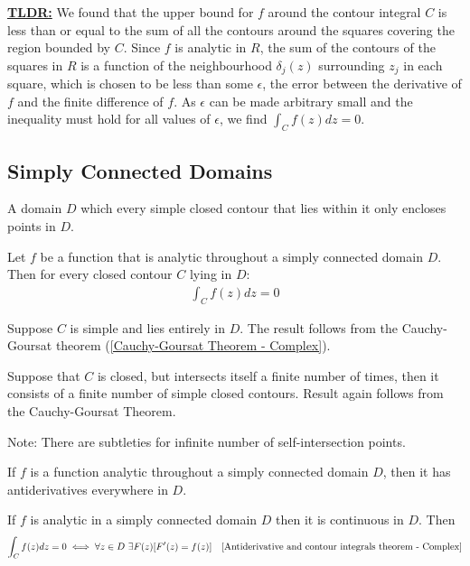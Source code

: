 \documentclass[12pt, english]{book}
\makeatletter
\renewenvironment{proof}[1][\proofname]{\par
	\pushQED{\qed}%
	\normalfont \topsep6\p@\@plus6\p@\relax
	\list{}{%
		\settowidth{\leftmargin}{\itshape\proofname:\hskip\labelsep}%
		\setlength{\labelwidth}{0pt}%
		\setlength{\itemindent}{-\leftmargin}%
	}%
	\item[\hskip\labelsep\itshape#1\@addpunct{:}]\ignorespaces
}{%
	\popQED\endlist\@endpefalse
}
\makeatother
\begin{document}
\begin{proof}
		\underline{\textbf{TLDR:}} \newline 
		We found that the upper bound for \(f\) around the contour integral \(C\) is less than or equal to the sum of all the contours around the squares covering the region bounded by \(C\). Since \(f\) is analytic in \(R\), the sum of the contours of the squares in \(R\) is a function of the neighbourhood \(\delta_j (z)\) surrounding \(z_j\) in each square, which is chosen to be less than some \(\epsilon\), the error between the derivative of \(f\) and the finite difference of \(f\). 
		As \(\epsilon\) can be made arbitrary small and the inequality must hold for all values of \(\epsilon\), we find \(\int_{C} f(z) dz = 0\).
	\end{proof}

	\subsection{Simply Connected Domains} \label{Simply Connected Domains Subsection - Complex}
	
	\begin{definition}
		\label{Simply Connected (Domain) Definition - Complex}
		A domain \(D\) which every simple closed contour that lies within it only encloses points in \(D\).
	\end{definition}

	\begin{theorem}
		\label{Contour integral in simply connected domain Theorem - Complex}
		Let \(f\) be a function that is analytic throughout a simply connected domain \(D\). Then for every closed contour \(C\) lying in \(D\):
		\begin{align*}
			\int_{C} f(z) dz = 0
		\end{align*}
	\end{theorem}
	\begin{proof}
		Suppose \(C\) is simple and lies entirely in \(D\). The result follows from the Cauchy-Goursat theorem (\cref{Cauchy-Goursat Theorem - Complex}).
		
		Suppose that \(C\) is closed, but intersects itself a finite number of times, then it consists of a finite number of simple closed contours. Result again follows from the Cauchy-Goursat Theorem. 
		
		Note: There are subtleties for infinite number of self-intersection points. 
	\end{proof}

	\begin{corollary}
		If \(f\) is a function analytic throughout a simply connected domain \(D\), then it has antiderivatives everywhere in \(D\).
	\end{corollary}
	\begin{proof}
		If \(f\) is analytic in a simply connected domain \(D\) then it is continuous in \(D\). Then
		\begin{align*}
			\int_{C} f(z) dz = 0 &\iff \forall z \in D \ \exists F(z)[F'(z) = f(z)] 
				&\Cref{Antiderivative and contour integrals theorem - Complex}
		\end{align*}
	\end{proof}
\end{document}
